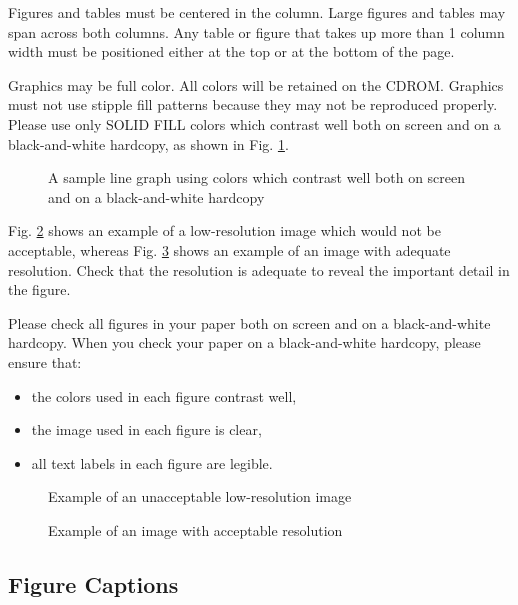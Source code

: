 \documentclass[10pt,conference,a4paper]{IEEEtran}
\begin{document}
Figures and tables must be centered in the column.  Large figures and
tables may span across both columns.  Any table or figure that takes
up more than 1 column width must be positioned either at the top or at
the bottom of the page.

Graphics may be full color.  All colors will be retained on the CDROM.
Graphics must not use stipple fill patterns because they may not be
reproduced properly.  Please use only SOLID FILL colors which contrast
well both on screen and on a black-and-white hardcopy, as shown in
Fig.  \ref{fig:sample_graph}.

\begin{figure}[h]
	\centerline{ }
	\caption{A sample line graph using colors which contrast well both on screen and on a black-and-white hardcopy}
	\label{fig:sample_graph}
\end{figure}

Fig. \ref{fig:lores-photo} shows an example of a low-resolution image
which would not be acceptable, whereas Fig.  \ref{fig:hires-photo}
shows an example of an image with adequate resolution.  Check that the
resolution is adequate to reveal the important detail in the figure.

Please check all figures in your paper both on screen and on a
black-and-white hardcopy.  When you check your paper on a
black-and-white hardcopy, please ensure that:

\begin{itemize}
\item	the colors used in each figure contrast well,
\item	the image used in each figure is clear,
\item	all text labels in each figure are legible.
\end{itemize}

\begin{figure}[h]
	\centerline{ }
	\caption{Example of an unacceptable low-resolution image}
	\label{fig:lores-photo}
\end{figure}

\begin{figure}[h]
	\centerline{ }
	\caption{Example of an image with acceptable resolution}
	\label{fig:hires-photo}
\end{figure}

\subsection{Figure Captions}
\end{document}
